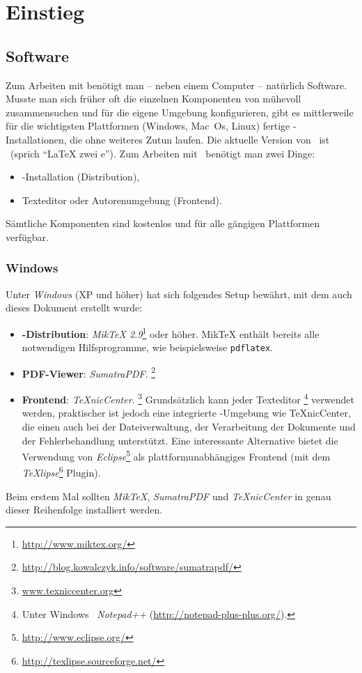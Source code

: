 \section{Einstieg}
\label{sec:LatexEinstieg}

\subsection{Software}

Zum Arbeiten mit \latex benötigt man -- neben einem Computer -- natürlich Software. Musste man sich früher oft die einzelnen Komponenten von \latex mühevoll zusammensuchen und für die eigene Umgebung konfigurieren, gibt es mittlerweile für die wichtigsten Plattformen (Windows, Mac~Os, Linux) fertige \latex-Installationen, die ohne weiteres Zutun laufen. Die aktuelle Version von \latex\ ist \LaTeXe\ (sprich "`LaTeX zwei e"'). 
Zum Arbeiten mit \latex\ benötigt man zwei Dinge:
%
\begin{itemize}
\item \latex-Installation (Distribution),
\item Texteditor oder Autorenumgebung (Frontend).
\end{itemize}
%
Sämtliche Komponenten sind kostenlos und für alle gängigen Plattformen verfügbar.


\subsubsection{Windows}
\label{sec:Windows}

Unter \emph{Windows} (XP und höher) hat sich folgendes Setup bewährt,
mit dem \ua auch dieses Dokument erstellt wurde:
%
\begin{itemize}
\item \textbf{\latex-Distribution}: \emph{MikTeX 2.9}\footnote{\url{http://www.miktex.org/}} oder höher.
MikTeX enthält bereits alle notwendigen Hilfsprogramme, wie beispielsweise {\tt pdflatex}.

\item \textbf{PDF-Viewer}: \emph{SumatraPDF}.%
\footnote{\url{http://blog.kowalczyk.info/software/sumatrapdf/}}

\item \textbf{Frontend}: \emph{TeXnicCenter}.%
\footnote{\url{www.texniccenter.org}}
Grundsätzlich kann jeder Texteditor%
\footnote{Unter Windows \zB\ \emph{Notepad++} (\url{http://notepad-plus-plus.org/}).}
verwendet werden, praktischer ist jedoch eine integrierte \latex-Um\-geb\-ung wie TeXnicCenter, die einen auch bei 
der Dateiverwaltung, der Verarbeitung der Dokumente und der Fehlerbehandlung unterstützt.
Eine interessante Alternative bietet die Verwendung von \emph{Eclipse}\footnote{\url{http://www.eclipse.org/}}
als plattformunabhängiges Frontend 
(mit dem \emph{TeXlipse}\footnote{\url{http://texlipse.sourceforge.net/}} Plugin).
\end{itemize}
%
Beim erstem Mal sollten \emph{MikTeX}, \emph{SumatraPDF} und \emph{TeXnicCenter} in genau dieser Reihenfolge installiert werden.


